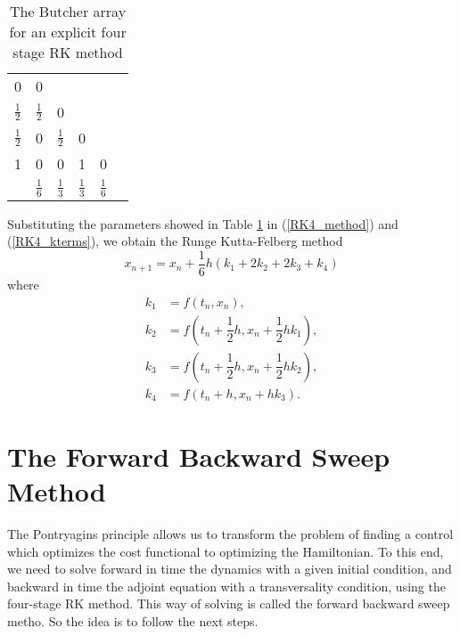     \begin{table}[h!]\label{tab:BA-RK4}
        \begin{center}
            \begin{tabular}{l | l l l l l} 
                0     & 0 &  &  &     \\
                $\frac{1}{2}$ & $\frac{1}{2}$ & 0 &  & \\
                $\frac{1}{2}$ & 0 & $\frac{1}{2}$ & 0 & \\
                1  & 0  &  0  & 1 & 0 \\
                \hline
                \hspace{0.1cm} & $\frac{1}{6}$ & $\frac{1}{3}$ & $\frac{1}{3}$ & $\frac{1}{6}$  \\
            \end{tabular}
            \caption{The Butcher array for an explicit four stage RK method}
        \end{center}
    \end{table}
    
    \noindent Substituting the parameters showed in Table \cref{tab:BA-RK4} 
    in (\ref{RK4_method}) and (\ref{RK4_kterms}), we obtain the Runge Kutta-Felberg method
    \begin{equation}\label{RK4_method}
        x_{n+1} = x_n + \dfrac{1}{6}h(k_{1} + 2k_{2} + 2k_{3} + k_{4})
    \end{equation}
    where
    \begin{equation}\label{RK4_kterms}
        \begin{aligned}
            k_1 &=  f(t_n, x_n), \\
            k_2 &=  f\left(t_n + \dfrac{1}{2}h, x_n + \dfrac{1}{2}hk_1\right), \\
            k_3 &=  f\left(t_n + \dfrac{1}{2}h, x_n + \dfrac{1}{2}hk_2\right), \\
            k_4 &=  f\left(t_n + h, x_n + hk_3\right). 
        \end{aligned}
    \end{equation}
\section*{The Forward Backward Sweep Method}
    The Pontryagins principle allows us to transform the problem of finding a
    control which optimizes the cost functional to optimizing the Hamiltonian. 
    To this end, we need to solve forward in time the dynamics with a given 
    initial condition, and backward in time the adjoint equation with a 
    transversality condition, using the four-stage  RK method. This way of
    solving is called the forward backward sweep metho. So the idea is to 
    follow the next steps.
    
